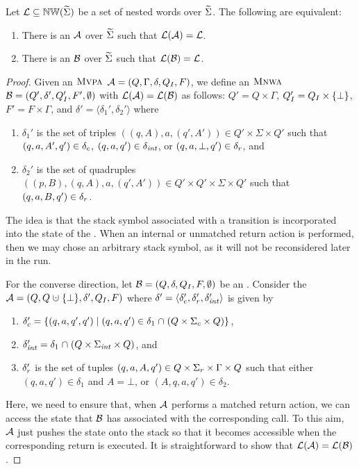 \documentclass{LMCS}
\begin{document}
\begin{lem}\label{lem:PAWA}
  Let $\mathcal{L} \mathrel{\subseteq} \mathbb{NW}(\widetilde{\Sigma})$ be a set of nested words over
  $\widetilde{\Sigma}$. The following are equivalent:
\begin{enumerate}[\em(1)]
\item There is an \MVPA $\mathcal{A}$ over $\widetilde{\Sigma}$ such that $\mathcal{L}(\mathcal{A}) = \mathcal{L}$.
\item There is an \MNWA $\mathcal{B}$ over $\widetilde{\Sigma}$ such that $\mathcal{L}(\mathcal{B}) = \mathcal{L}$.
\end{enumerate}
\end{lem}

\begin{proof}
  Given an $\textsc{Mvpa}$ $\mathcal{A}=(Q,\Gamma,\delta,Q_I,F)$, we define an $\textsc{Mnwa}$
  $\mathcal{B}=(Q',\delta',Q_I',F',\emptyset)$ with $\mathcal{L}(\mathcal{A}) = \mathcal{L}(\mathcal{B})$ as
  follows: $Q' = Q \times \Gamma$, $Q_I' = Q_I \times \{\bot\}$, $F' = F
  \times \Gamma$, and $\delta' = \langle \delta_1' , \delta_2' \rangle$ where
  \begin{enumerate}[$\bullet$]
  \item $\delta_1'$ is the set of triples $((q,A),a,(q',A')) \in Q' \times
    \Sigma \times Q'$ such that $(q,a,A',q') \in \delta_c$, $(q,a,q') \in
    \delta_{\mathit{int}}$, or $(q,a,\bot,q') \in \delta_r$, and
  \item $\delta_2'$ is the set of quadruples $((p,B),(q,A),a,(q',A')) \in Q'
    \times Q' \times \Sigma \times Q'$ such that $(q,a,B,q') \in \delta_r$.
  \end{enumerate}
  The idea is that the stack symbol associated with a transition is
  incorporated into the state of the \MNWA. When an internal or unmatched
  return action is performed, then we may chose an arbitrary stack symbol, as
  it will not be reconsidered later in the run.

  For the converse direction, let $\mathcal{B}=(Q,\delta,Q_I,F,\emptyset)$ be an
  \MNWA. Consider the \MVPA $\PA=(Q,Q \uplus \{\bot\},\delta',\Init,F)$ where
  $\delta' = \langle \delta_c' , \delta_r', \delta_{\mathit{int}}' \rangle$ is given by
  \begin{enumerate}[$\bullet$]
  \item $\delta_c' = \{(q,a,q',q') \mid (q,a,q') \in \delta_1 \mathrel{\cap} (Q
    \times \Sigma_c \times Q)\}$,
  \item $\delta_{\mathit{int}}' = \delta_1 \mathrel{\cap} (Q \times \Sigma_{\mathit{int}} \times Q)$,
    and
  \item $\delta_r'$ is the set of tuples $(q,a,A,q') \in Q \times \Sigma_r
    \times \Gamma \times Q$ such that either $(q,a,q') \in \delta_1$ and $A =
    \bot$, or $(A,q,a,q') \in \delta_2$.
\end{enumerate}
Here, we need to ensure that, when $\mathcal{A}$ performs a matched return action, we
can access the state that $\mathcal{B}$ has associated with the corresponding call. To
this aim, $\mathcal{A}$ just pushes the state onto the stack so that it becomes
accessible when the corresponding return is executed. It is straightforward to
show that $\mathcal{L}(\mathcal{A}) = \mathcal{L}(\mathcal{B})$.
\end{proof}
\end{document}
